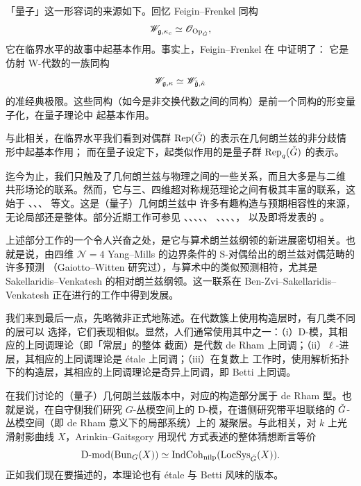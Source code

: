     \begin{re} 「量子」这一形容词的来源如下。回忆 Feigin--Frenkel 同构
    \[      \mathscr{W}_{\mathfrak{g}, \kappa_c} \simeq \mathscr{O}_{\mathrm{Op}_{\check{G}}},
    \]
    它在临界水平的故事中起基本作用。事实上，Feigin--Frenkel 在 \cite{feiginfrenkel91} 中证明了：
    它是仿射 W-代数的一族同构
    \[   \mathscr{W}_{\mathfrak{g}, \kappa} \simeq \mathscr{W}_{\check{\mathfrak{g}}, \check{\kappa}} \]
    的准经典极限。这些同构（如今是非交换代数之间的同构）是前一个同构的形变量子化，在量子理论中
    起基本作用。

    与此相关，在临界水平我们看到对偶群 $\operatorname{Rep}(\check{G})$ 的表示在几何朗兰兹的非分歧情形中起基本作用；
    而在量子设定下，起类似作用的是量子群 $\operatorname{Rep}_q(\check{G})$ 的表示。
    \end{re}

   \ssszh[与物理的联系] 迄今为止，我们只触及了几何朗兰兹与物理之间的一些关系，而且大多是与二维
   共形场论的联系。然而，它与三、四维超对称规范理论之间有极其丰富的联系，这始于
   \cite{kapustinwitten}、\cite{wittenwild}、\cite{gukovwitten}、\cite{frenkelwitten} 等文。这是（量子）几何朗兰兹中
   许多有趣构造与预期相容性的来源，无论局部还是整体。部分近期工作可参见
   \cite{gaiotto16s-duality}、\cite{gaiottorapcak}、\cite{bfn}、\cite{gaiottotwistcompact}、\cite{costellogaiotto}、
   \cite{creutziggaiotto}、\cite{creutziggaiottolinshaw}、\cite{frenkelgaiotto}、\cite{bfgt}、\cite{hilburnraskin}，
   以及即将发表的 \cite{gaiottoyu}。

 \begin{re}
   上述部分工作的一个令人兴奋之处，是它与算术朗兰兹纲领的新进展密切相关。也就是说，由四维
   $\mathscr{N} = 4$ Yang--Mills 的边界条件的 S-对偶给出的朗兰兹对偶范畴的许多预测
   （Gaiotto--Witten \cite{gaiottowitten} 研究过），与算术中的类似预测相符，尤其是
   Sakellaridis--Venkatesh \cite{sakellaridisvenkatesh} 的相对朗兰兹纲领。这一联系在
   Ben-Zvi--Sakellaridis--Venkatesh 正在进行的工作中得到发展。
\end{re}

	\ssszh 我们来到最后一点，先略微非正式地陈述。在代数簇上使用构造层时，有几类不同的层可以
	选择，它们表现相似。显然，人们通常使用其中之一：（i）D-模，其相应的上同调理论（即「常层」的整体
	截面）是代数 de Rham 上同调；（ii）$\ell$-进层，其相应的上同调理论是 étale 上同调；（iii）在复数上
	工作时，使用解析拓扑下的构造层，其相应的上同调理论是奇异上同调，即 Betti 上同调。

	在我们讨论的（量子）几何朗兰兹版本中，对应的构造部分属于 de Rham 型。也就是说，在自守侧我们研究
	$G$-丛模空间上的 D-模，在谱侧研究带平坦联络的 $\check{G}$-丛模空间（即 de Rham 意义下的局部系统）上的
	凝聚层。与此相关，对 $k$ 上光滑射影曲线 $X$，Arinkin--Gaitsgory \cite{arinkingaitssingsupp} 用现代
	方式表述的整体猜想断言等价
	\[
	\operatorname{D-mod}(\operatorname{Bun}_G(X)) \simeq \operatorname{IndCoh}_{\operatorname{nilp}}(\operatorname{LocSys}_{\check{G}}(X)).
	\]
	正如我们现在要描述的，本理论也有 étale 与 Betti 风味的版本。

